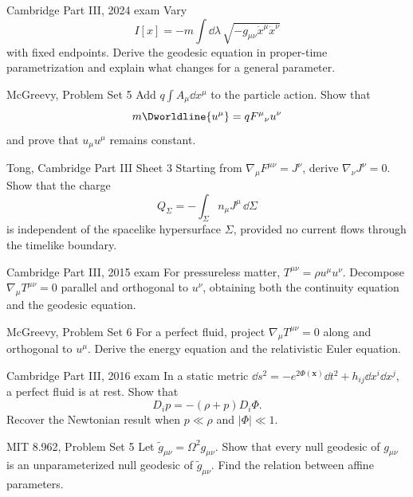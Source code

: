 \begin{exercises}

\begin{exercise}{Cambridge Part III, 2024 exam}
Vary
\[
I[x]=-m\int\dd\lambda\,
\sqrt{-g_{\mu\nu}\dot x^\mu\dot x^\nu}
\]
with fixed endpoints.  Derive the geodesic equation in proper-time
parametrization and explain what changes for a general parameter.
\end{exercise}

\begin{exercise}{McGreevy, Problem Set 5}
Add \(q\int A_\mu\dd x^\mu\) to the particle action.  Show that
\[
m\Dworldline{u^\mu}=qF^\mu{}_\nu u^\nu
\]
and prove that \(u_\mu u^\mu\) remains constant.
\end{exercise}

\begin{exercise}{Tong, Cambridge Part III Sheet 3}
Starting from \(\nabla_\mu F^{\mu\nu}=J^\nu\), derive
\(\nabla_\nu J^\nu=0\).  Show that the charge
\[
Q_\Sigma=-\int_\Sigma n_\mu J^\mu\,\dd\Sigma
\]
is independent of the spacelike hypersurface \(\Sigma\), provided no current
flows through the timelike boundary.
\end{exercise}

\begin{exercise}{Cambridge Part III, 2015 exam}
For pressureless matter,
\(T^{\mu\nu}=\rho u^\mu u^\nu\).  Decompose
\(\nabla_\mu T^{\mu\nu}=0\) parallel and orthogonal to \(u^\nu\), obtaining
both the continuity equation and the geodesic equation.
\end{exercise}

\begin{exercise}{McGreevy, Problem Set 6}
For a perfect fluid, project \(\nabla_\mu T^{\mu\nu}=0\) along and orthogonal
to \(u^\mu\).  Derive the energy equation and the relativistic Euler equation.
\end{exercise}

\begin{exercise}{Cambridge Part III, 2016 exam}
In a static metric
\(\dd s^2=-e^{2\Phi(\bm x)}\dd t^2+h_{ij}\dd x^i\dd x^j\), a perfect fluid is
at rest.  Show that
\[
D_i p=-(\rho+p)D_i\Phi.
\]
Recover the Newtonian result when \(p\ll\rho\) and \(|\Phi|\ll1\).
\end{exercise}

\begin{exercise}{MIT 8.962, Problem Set 5}
Let \(\widetilde g_{\mu\nu}=\Omega^2g_{\mu\nu}\).  Show that every null
geodesic of \(g_{\mu\nu}\) is an unparameterized null geodesic of
\(\widetilde g_{\mu\nu}\).  Find the relation between affine parameters.
\end{exercise}


\end{exercises}
